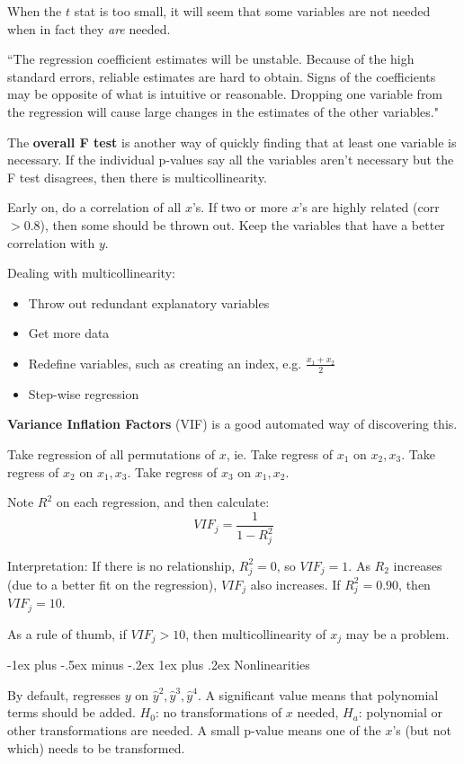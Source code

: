\documentclass[10pt,landscape]{article}
\makeatletter
\renewcommand{\subsubsection}{\@startsection{subsubsection}{3}{0mm}%
                                {-1ex plus -.5ex minus -.2ex}%
                                {1ex plus .2ex}%
                                {\normalfont\small\bfseries}}
\makeatother
\begin{document}
\begin{multicols*}{3}
When the $t$ stat is too small, it will seem that some variables are not needed when in fact they \textit{are} needed.

``The regression coefficient estimates will be unstable. Because of the high standard errors, reliable estimates are hard to obtain. Signs of the coefficients may be opposite of what is intuitive or reasonable. Dropping one variable from the regression will cause large changes in the estimates of the other variables."

The \textbf{overall F test} is another way of quickly finding that at least one variable is necessary. If the individual p-values say all the variables aren't necessary but the F test disagrees, then there is multicollinearity.

Early on, do a correlation of all $x$'s. If two or more $x$'s are highly related (corr $> 0.8$), then some should be thrown out. Keep the variables that have a better correlation with $y$. 

Dealing with multicollinearity:
\begin{itemize}
\item{Throw out redundant explanatory variables}
\item{Get more data}
\item{Redefine variables, such as creating an index, e.g. $\frac{x_1 + x_2}{2}$}
\item{Step-wise regression}
\end{itemize}

\textbf{Variance Inflation Factors} (VIF) is a good automated way of discovering this. 

Take regression of all permutations of $x$, ie. 
Take regress of $x_1$ on $x_2, x_3$.
Take regress of $x_2$ on $x_1, x_3$.
Take regress of $x_3$ on $x_1, x_2$.

Note $R^2$ on each regression, and then calculate:
\[
VIF_j = \frac{1} {1-R^2_j}
\]

Interpretation: If there is no relationship, $R^2_j = 0$, so $VIF_j=1$.  As $R_2$ increases (due to a better fit on the regression), $VIF_j$ also increases. If $R^2_j = 0.90$, then $VIF_j = 10$.  

As a rule of thumb, if $VIF_j > 10$, then multicollinearity of $x_j$ may be a problem.

\subsubsection{Nonlinearities}

By default, regresses $y$ on $\hat{y}^2, \hat{y}^3, \hat{y}^4$. A significant value means that polynomial terms should be added. $H_0$: no transformations of $x$ needed, $H_a$: polynomial or other transformations are needed. A small p-value means one of the $x$'s (but not which) needs to be transformed.


\end{multicols*}
\end{document}
